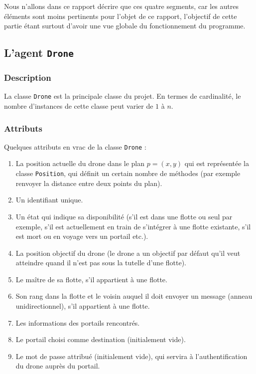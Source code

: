 \documentclass[11pt]{report}
\begin{document}
Nous n'allons dans ce rapport décrire que ces quatre segments, car les autres éléments sont moins pertinents pour l'objet de ce rapport, l'objectif de cette partie étant surtout d'avoir une vue globale du fonctionnement du programme.

\subsection{L'agent \protect\Verb+Drone+}

\subsubsection{Description}

La classe \verb|Drone| est la principale classe du projet. En termes de cardinalité, le nombre d'instances de cette classe peut varier de $1$ à $n$.

\subsubsection{Attributs}

Quelques attributs en vrac de la classe \verb|Drone| :

\begin{enumerate}
\item La position actuelle du drone dans le plan $p = (x, y)$ qui est représentée la classe \verb|Position|, qui définit un certain nombre de méthodes (par exemple renvoyer la distance entre deux points du plan).

\item Un identifiant unique.

\item Un état qui indique sa disponibilité (s'il est dans une flotte ou seul par exemple, s'il est actuellement en train de s'intégrer à une flotte existante, s'il est mort ou en voyage vers un portail etc.).

\item La position objectif du drone (le drone a un objectif par défaut qu'il veut atteindre quand il n'est pas sous la tutelle d'une flotte).

\item Le maître de sa flotte, s'il appartient à une flotte.

\item Son rang dans la flotte et le voisin auquel il doit envoyer un message (anneau unidirectionnel), s'il appartient à une flotte.

\item Les informations des portails rencontrés.

\item Le portail choisi comme destination (initialement vide).

\item Le mot de passe attribué (initialement vide), qui servira à l'authentification du drone auprès du portail.
\end{enumerate}
\end{document}
